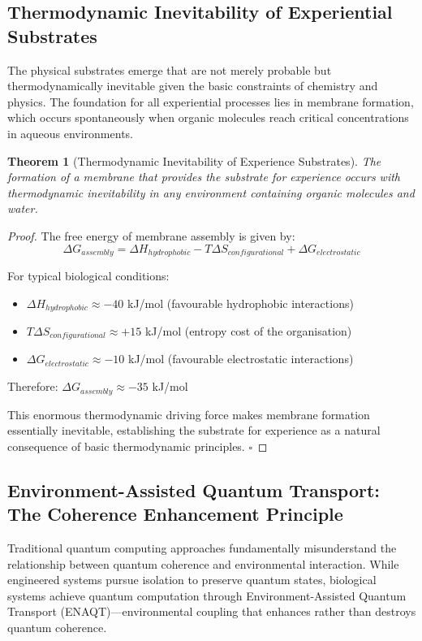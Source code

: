 \documentclass{article}
\newtheorem{theorem}{Theorem}[section]
\begin{document}
\subsection{Thermodynamic Inevitability of Experiential Substrates}

The physical substrates emerge that are not merely probable but thermodynamically inevitable given the basic constraints of chemistry and physics. The foundation for all experiential processes lies in membrane formation, which occurs spontaneously when organic molecules reach critical concentrations in aqueous environments.

\begin{theorem}[Thermodynamic Inevitability of Experience Substrates]
The formation of a membrane that provides the substrate for experience occurs with thermodynamic inevitability in any environment containing organic molecules and water.
\end{theorem}

\begin{proof}
The free energy of membrane assembly is given by:
$$\Delta G_{assembly} = \Delta H_{hydrophobic} - T\Delta S_{configurational} + \Delta G_{electrostatic}$$

For typical biological conditions:
\begin{itemize}
\item $\Delta H_{hydrophobic} \approx -40$ kJ/mol (favourable hydrophobic interactions)
\item $T\Delta S_{configurational} \approx +15$ kJ/mol (entropy cost of the organisation) 
\item $\Delta G_{electrostatic} \approx -10$ kJ/mol (favourable electrostatic interactions)
\end{itemize}

Therefore: $\Delta G_{assembly} \approx -35$ kJ/mol

This enormous thermodynamic driving force makes membrane formation essentially inevitable, establishing the substrate for experience as a natural consequence of basic thermodynamic principles. $\square$
\end{proof}

\subsection{Environment-Assisted Quantum Transport: The Coherence Enhancement Principle}

Traditional quantum computing approaches fundamentally misunderstand the relationship between quantum coherence and environmental interaction. While engineered systems pursue isolation to preserve quantum states, biological systems achieve quantum computation through Environment-Assisted Quantum Transport (ENAQT)—environmental coupling that enhances rather than destroys quantum coherence.
\end{document}
